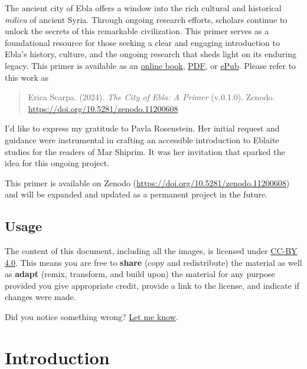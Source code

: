 \documentclass[
]{book}
\begin{document}
The ancient city of Ebla offers a window into the rich cultural and historical \emph{milieu} of ancient Syria. Through ongoing research efforts, scholars continue to unlock the secrets of this remarkable civilization. This primer serves as a foundational resource for those seeking a clear and engaging introduction to Ebla's history, culture, and the ongoing research that sheds light on its enduring legacy. This primer is available as an \href{https://erica-scarpa.github.io/the-city-of-ebla-primer/}{online book}, \href{https://erica-scarpa.github.io/the-city-of-ebla-primer/_main.pdf}{PDF}, or \href{https://erica-scarpa.github.io/the-city-of-ebla-primer/_main.epub}{ePub}.
Please refer to this work as

\begin{quote}
Erica Scarpa. (2024). \emph{The City of Ebla: A Primer} (v.0.1.0). Zenodo. \url{https://doi.org/10.5281/zenodo.11200608}
\end{quote}

I'd like to express my gratitude to Pavla Rosenstein. Her initial request and guidance were instrumental in crafting an accessible introduction to Eblaite studies for the readers of Mar Shiprim. It was her invitation that sparked the idea for this ongoing project.

This primer is available on Zenodo (\url{https://doi.org/10.5281/zenodo.11200608}) and will be expanded and updated as a permanent project in the future.

\hypertarget{usage}{%
\section*{Usage}\label{usage}}

The content of this document, including all the images, is licensed under \href{https://creativecommons.org/licenses/by-sa/4.0/}{CC-BY 4.0}. This means you are free to \textbf{share} (copy and redistribute) the material as well as \textbf{adapt} (remix, transform, and build upon) the material for any purpose provided you give appropriate credit, provide a link to the license, and indicate if changes were made.

Did you notice something wrong? \href{mailto:erica.scarpa@cnr.it}{Let me know}.

\hypertarget{introduction}{%
\chapter{Introduction}\label{introduction}}
\end{document}
